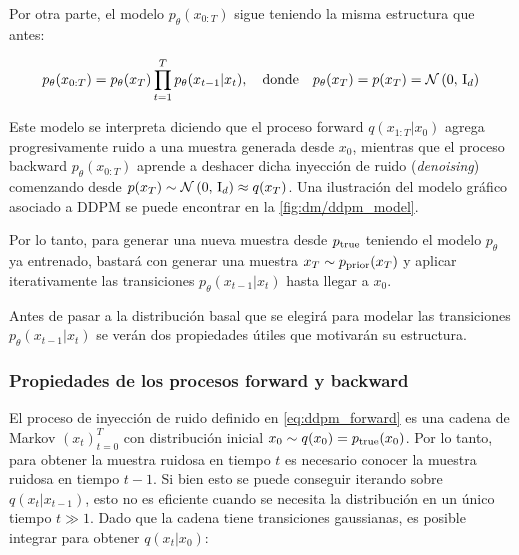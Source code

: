 Por otra parte, el modelo $p_\theta(x_{0:T})$ sigue teniendo la misma estructura que antes:

\begin{equation}
    p_\theta(x_{0:T}) = p_\theta(x_T)\prod_{t=1}^{T} p_\theta(x_{t-1}|x_t),
    \quad\text{donde}\quad
    p_\theta(x_T) = p(x_T) = \mathcal{N}\left(0,\,\operatorname{I}_{d}\right)
    \label{eq:ddpm_backward}
\end{equation}

Este modelo se interpreta diciendo que el proceso forward $q(x_{1:T}|x_0)$ agrega progresivamente ruido a una muestra generada desde $x_0$, mientras que el proceso backward $p_\theta(x_{0:T})$ aprende a deshacer dicha inyección de ruido (\textit{denoising}) comenzando desde $p(x_T)\sim \mathcal{N}\left(0,\,\operatorname{I}_{d}\right)\approx q(x_T)$. Una ilustración del modelo gráfico asociado a DDPM se puede encontrar en la \autoref{fig:dm/ddpm_model}.


Por lo tanto, para generar una nueva muestra desde $p_{\operatorname{true}}$ teniendo el modelo $p_\theta$ ya entrenado, bastará con generar una muestra $x_T\sim p_{\operatorname{prior}}(x_T)$ y aplicar iterativamente las transiciones $p_\theta(x_{t-1}|x_t)$ hasta llegar a $x_0$.

Antes de pasar a la distribución basal que se elegirá para modelar las transiciones $p_\theta(x_{t-1}|x_t)$ se verán dos propiedades útiles que motivarán su estructura.

\subsubsection{Propiedades de los procesos forward y backward}

El proceso de inyección de ruido definido en \eqref{eq:ddpm_forward} es una cadena de Markov $(x_t)_{t=0}^T$ con distribución inicial $x_0\sim q(x_0)=p_{\operatorname{true}}(x_0)$. Por lo tanto, para obtener la muestra ruidosa en tiempo $t$ es necesario conocer la muestra ruidosa en tiempo $t-1$. Si bien esto se puede conseguir iterando sobre $q(x_t|x_{t-1})$, esto no es eficiente cuando se necesita la distribución en un único tiempo $t\gg 1$. Dado que la cadena tiene transiciones gaussianas, es posible integrar para obtener $q(x_t|x_0)$:

